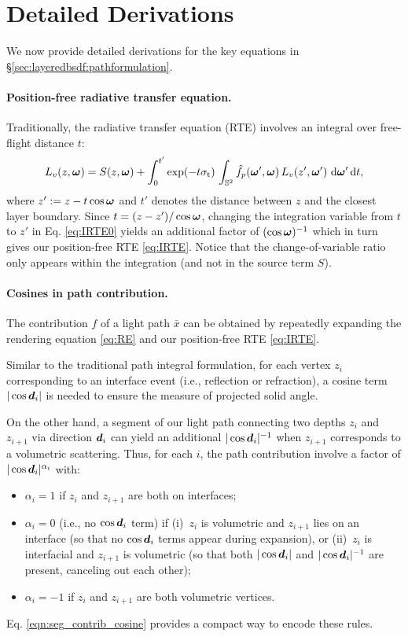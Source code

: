 \section{Detailed Derivations}
\label{sec:layeredbsdf:derivation}

We now provide detailed derivations for the key equations in \S\ref{sec:layeredbsdf:pathformulation}.

\paragraph{Position-free radiative transfer equation.}
Traditionally, the radiative transfer equation (RTE) involves an integral over free-flight distance $t$:
\begin{equation}
\label{eq:IRTE0}
  L_v(z, \bm\omega) = S(z, \bm\omega) + \int_0^{t'} \exp(-t \sigma_\mathrm{t}) \, \int_{\mathbb{S}^2} \hat f_p(\bm\omega', \bm\omega) \, L_v(z', \bm\omega') \,\,\mathrm{d} \bm\omega' \,\mathrm{d} t,
\end{equation}
where $z' := z - t\cos\bm\omega$ and $t'$ denotes the distance between $z$ and the closest layer boundary.
Since $t = (z - z')/\cos\bm\omega$, changing the integration variable from $t$ to $z'$ in Eq. \eqref{eq:IRTE0} yields an additional factor of $(\cos\bm\omega)^{-1}$ which in turn gives our position-free RTE \eqref{eq:IRTE}.
Notice that the change-of-variable ratio only appears within the integration (and not in the source term $S$).

\paragraph{Cosines in path contribution.}
The contribution $f$ of a light path $\bar{x}$ can be obtained by repeatedly expanding the rendering equation \eqref{eq:RE} and our position-free RTE \eqref{eq:IRTE}.

Similar to the traditional path integral formulation, for each vertex $z_i$ corresponding to an interface event (i.e., reflection or refraction), a cosine term $|\cos\bm{d}_i|$ is needed to ensure the measure of projected solid angle.

On the other hand, a segment of our light path connecting two depths $z_i$ and $z_{i + 1}$ via direction $\bm{d}_i$ can yield an additional $|\cos\bm{d}_i|^{-1}$ when $z_{i + 1}$ corresponds to a volumetric scattering.
Thus, for each $i$, the path contribution involve a factor of $|\cos\bm{d}_i|^{\alpha_i}$ with:
\begin{itemize}
	\item $\alpha_i = 1$ if $z_i$ and $z_{i + 1}$ are both on interfaces;
	\item $\alpha_i = 0$ (i.e., no $\cos\bm{d}_i$ term) if (i)~$z_i$ is volumetric and $z_{i + 1}$ lies on an interface (so that no $\cos\bm{d}_i$ terms appear during expansion), or (ii)~$z_i$ is interfacial and $z_{i + 1}$ is volumetric (so that both $|\cos\bm{d}_i|$ and $|\cos\bm{d}_i|^{-1}$ are present, canceling out each other);
	\item $\alpha_i = -1$ if $z_i$ and $z_{i + 1}$ are both volumetric vertices.
\end{itemize}
Eq. \eqref{eqn:seg_contrib_cosine} provides a compact way to encode these rules. 
